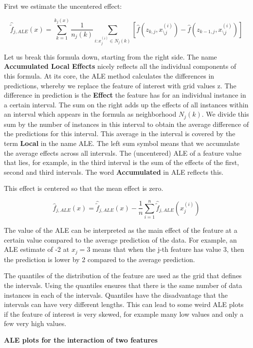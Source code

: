 \documentclass[
  11pt,
]{scrbook}
\begin{document}
First we estimate the uncentered effect:

\[\hat{\tilde{f}}_{j,ALE}(x)=\sum_{k=1}^{k_j(x)}\frac{1}{n_j(k)}\sum_{i:x_{j}^{(i)}\in{}N_j(k)}\left[\hat{f}(z_{k,j},x^{(i)}_{\setminus{}j})-\hat{f}(z_{k-1,j},x^{(i)}_{\setminus{}j})\right]\]

Let us break this formula down, starting from the right side.
The name \textbf{Accumulated Local Effects} nicely reflects all the individual components of this formula.
At its core, the ALE method calculates the differences in predictions, whereby we replace the feature of interest with grid values z.
The difference in prediction is the \textbf{Effect} the feature has for an individual instance in a certain interval.
The sum on the right adds up the effects of all instances within an interval which appears in the formula as neighborhood \(N_j(k)\).
We divide this sum by the number of instances in this interval to obtain the average difference of the predictions for this interval.
This average in the interval is covered by the term \textbf{Local} in the name ALE.
The left sum symbol means that we accumulate the average effects across all intervals.
The (uncentered) ALE of a feature value that lies, for example, in the third interval is the sum of the effects of the first, second and third intervals.
The word \textbf{Accumulated} in ALE reflects this.

This effect is centered so that the mean effect is zero.

\[\hat{f}_{j,ALE}(x)=\hat{\tilde{f}}_{j,ALE}(x)-\frac{1}{n}\sum_{i=1}^{n}\hat{\tilde{f}}_{j,ALE}(x^{(i)}_{j})\]

The value of the ALE can be interpreted as the main effect of the feature at a certain value compared to the average prediction of the data.
For example, an ALE estimate of -2 at \(x_j=3\) means that when the j-th feature has value 3, then the prediction is lower by 2 compared to the average prediction.

The quantiles of the distribution of the feature are used as the grid that defines the intervals.
Using the quantiles ensures that there is the same number of data instances in each of the intervals.
Quantiles have the disadvantage that the intervals can have very different lengths.
This can lead to some weird ALE plots if the feature of interest is very skewed, for example many low values and only a few very high values.

\textbf{ALE plots for the interaction of two features}
\end{document}
